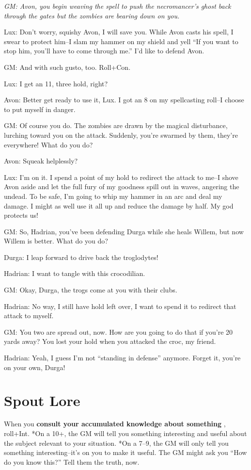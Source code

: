 {\itshape
 GM: Avon, you begin weaving the spell to push the necromancer's ghost back through the gates but the zombies are bearing down on you.


 Lux: Don't worry, squishy Avon, I will save you. While Avon casts his spell, I swear to protect him--I slam my hammer on my shield and yell ``If you want to stop him, you'll have to come through me.'' I'd like to defend Avon.


 GM: And with such gusto, too. Roll+Con.


 Lux: I get an 11, three hold, right?


 Avon: Better get ready to use it, Lux. I got an 8 on my spellcasting roll--I choose to put myself in danger.


 GM: Of course you do. The zombies are drawn by the magical disturbance, lurching toward you on the attack. Suddenly, you're swarmed by them, they're everywhere! What do you do?


 Avon: Squeak helplessly?


 Lux: I'm on it. I spend a point of my hold to redirect the attack to me--I shove Avon aside and let the full fury of my goodness spill out in waves, angering the undead. To be safe, I'm going to whip my hammer in an arc and deal my damage. I might as well use it all up and reduce the damage by half. My god protects us!


 GM: So, Hadrian, you've been defending Durga while she heals Willem, but now Willem is better. What do you do?


 Durga: I leap forward to drive back the troglodytes!


 Hadrian: I want to tangle with this crocodilian.


 GM: Okay, Durga, the trogs come at you with their clubs.


 Hadrian: No way, I still have hold left over, I want to spend it to redirect that attack to myself.


 GM: You two are spread out, now. How are you going to do that if you're 20 yards away? You lost your hold when you attacked the croc, my friend.


 Hadrian: Yeah, I guess I'm not ``standing in defense'' anymore. Forget it, you're on your own, Durga!
}
\section*{Spout Lore}
\HRule
 When you \textbf{consult your accumulated knowledge about something}
, roll+Int. *On a 10+, the GM will tell you something interesting and useful about the subject relevant to your situation. *On a 7--9, the GM will only tell you something interesting--it's on you to make it useful. The GM might ask you ``How do you know this?'' Tell them the truth, now.
\HRule


